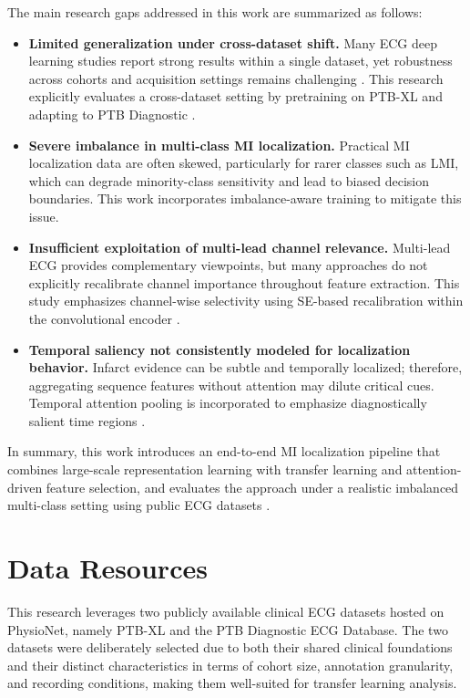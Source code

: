 \documentclass[preprint,12pt]{elsarticle}
\begin{document}
The main research gaps addressed in this work are summarized as follows:
\begin{itemize}
  \item \textbf{Limited generalization under cross-dataset shift.} Many ECG deep learning studies report strong results within a single dataset, yet robustness across cohorts and acquisition settings remains challenging \cite{StrodthoffWagnerSchaeffterSamek2021JBHI_PTBXL_Benchmarks,Wagner2020SciData_PTBXL}. This research explicitly evaluates a cross-dataset setting by pretraining on PTB-XL and adapting to PTB Diagnostic \cite{WeimannConrad2021SciRep_TL_ECG,ChuiGuptaZhaoMalibariAryaAlhalabiRuiz2022Bioengineering_DistantTL_ECG}.
  \item \textbf{Severe imbalance in multi-class MI localization.} Practical MI localization data are often skewed, particularly for rarer classes such as LMI, which can degrade minority-class sensitivity and lead to biased decision boundaries. This work incorporates imbalance-aware training to mitigate this issue.
  \item \textbf{Insufficient exploitation of multi-lead channel relevance.} Multi-lead ECG provides complementary viewpoints, but many approaches do not explicitly recalibrate channel importance throughout feature extraction. This study emphasizes channel-wise selectivity using SE-based recalibration within the convolutional encoder \cite{Sun2024Sensors_CNNLSTMSE,QuFu2025JSMU_ResLSTM_TemporalSE}.
  \item \textbf{Temporal saliency not consistently modeled for localization behavior.} Infarct evidence can be subtle and temporally localized; therefore, aggregating sequence features without attention may dilute critical cues. Temporal attention pooling is incorporated to emphasize diagnostically salient time regions \cite{Cao2022FrontPhysiol_MSResNet_Attn_MI,Chen2025Biosensors_MDF_Fusion_MI,LimKim2025ApplSci_SpikeCAN}.
\end{itemize}

In summary, this work introduces an end-to-end MI localization pipeline that combines large-scale representation learning with transfer learning and attention-driven feature selection, and evaluates the approach under a realistic imbalanced multi-class setting using public ECG datasets \cite{Wagner2020SciData_PTBXL,NguyenDo2025PLOSone_TL_ECG_Effective}.





\section{Data Resources}
This research leverages two publicly available clinical ECG datasets hosted on PhysioNet, namely PTB-XL and the PTB Diagnostic ECG Database. The two datasets were deliberately selected due to both their shared clinical foundations and their distinct characteristics in terms of cohort size, annotation granularity, and recording conditions, making them well-suited for transfer learning analysis.
\end{document}
